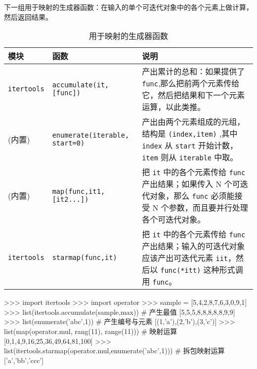 下一组用于映射的生成器函数：在输入的单个可迭代对象中的各个元素上做计算，然后返回结果。

\begin{table}[H]
    \centering
    \caption{用于映射的生成器函数}
    \label{table:用于映射的生成器函数}
    \setlength{\tabcolsep}{2mm}
    \small
    \begin{tabular}{l|l|p{9cm}}
        \toprule
        \textbf{模块} & \textbf{函数} & \textbf{说明} \\
        \midrule
        \texttt{itertools} & \texttt{accumulate(it,[func])} & 产出累计的总和：如果提供了 \texttt{func},那么把前两个元素传给它，然后把结果和下一个元素运算，以此类推。 \\
        \midrule
        (内置) & \texttt{enumerate(iterable, start=0)} & 产出由两个元素组成的元组，结构是 \texttt{(index,item)} ,其中 \texttt{index} 从 \texttt{start} 开始计数， \texttt{item} 则从 \texttt{iterable} 中取。 \\
        \midrule
        (内置) & \texttt{map(func,it1,[it2...])} & 把 \texttt{it} 中的各个元素传给 \texttt{func} 产出结果；如果传入 N 个可迭代对象，那么 \texttt{func} 必须能接受 N 个参数，而且要并行处理各个可迭代对象。 \\
        \midrule
        \texttt{itertools} & \texttt{starmap(func,it)} & 把 \texttt{it} 中的各个元素传给 \texttt{func} 产出结果；输入的可迭代对象应该产出可迭代元素 \texttt{iit}，然后以 \texttt{func(*itt)} 这种形式调用 \texttt{func}。 \\
        \bottomrule
    \end{tabular}
\end{table}

\begin{python}
>>> import itertools
>>> import operator
>>> sample = [5,4,2,8,7,6,3,0,9,1]
>>> list(itertools.accumulate(sample,max))  # 产生最值
[5,5,5,8,8,8,8,8,9,9]
>>> list(enumerate('abc',1))    # 产生编号与元素
[(1,'a'),(2,'b'),(3,'c')]
>>> list(map(operator.mul, rang(11), range(11)))    # 映射运算
[0,1,4,9,16,25,36,49,64,81,100]
>>> list(itertools.starmap(operator.mul,enumerate('abc',1)))    # 拆包映射运算
['a','bb','ccc']
\end{python}

